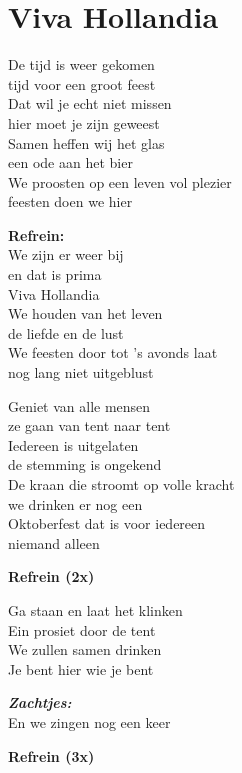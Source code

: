 \section{Viva Hollandia}
De tijd is weer gekomen\\
tijd voor een groot feest\\
Dat wil je echt niet missen\\
hier moet je zijn geweest\\
Samen heffen wij het glas\\
een ode aan het bier\\
We proosten op een leven vol plezier\\
feesten doen we hier

\textbf{Refrein:}\\
We zijn er weer bij\\
en dat is prima\\
Viva Hollandia\\
We houden van het leven\\
de liefde en de lust\\
We feesten door tot 's avonds laat\\
nog lang niet uitgeblust

Geniet van alle mensen\\
ze gaan van tent naar tent\\
Iedereen is uitgelaten\\
de stemming is ongekend\\
De kraan die stroomt op volle kracht\\
we drinken er nog een\\
Oktoberfest dat is voor iedereen\\
niemand alleen

\textbf{Refrein (2x)}

Ga staan en laat het klinken\\
Ein prosiet door de tent\\
We zullen samen drinken\\
Je bent hier wie je bent

\textit{\textbf{Zachtjes:}}\\
En we zingen nog een keer

\textbf{Refrein (3x)}